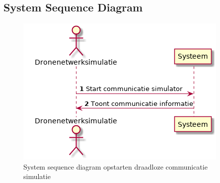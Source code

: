 \documentclass[a4paper, 11pt, oneside]{report}
\begin{document}
%

\label{Usecase:simmulatiecommuicatie:fully-dressed}
\subsection{System Sequence Diagram }
\label{Usecase:simmulatiecommuicatie:systemsequence}

\begin{figure}[H]
	\begin{center}\includegraphics[height=.2\textheight]{UML/out/usecase/sequence/Simulerendraadlozecommunicatie/Simulerendraadlozecommunicatie.png}\end{center}
	\caption{System sequence diagram opstarten draadloze communicatie simulatie}
	\label{fig:simmulatiecommuicatie:systemsequence}
\end{figure}
\end{document}
